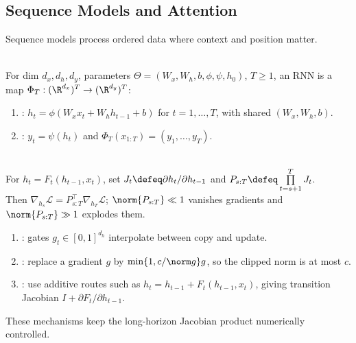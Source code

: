 \subsection{Sequence Models and Attention}

Sequence models process ordered data where context and position matter.

\begin{definition} \label{def:sl-recurrent-network} \\
For dim $d_x,d_h,d_y$, parameters $\Theta=(W_x,W_h,b,\phi,\psi,h_0)$, $T\geq1$, an RNN is a map $\Phi_T:(\R^{d_x})^T\to(\R^{d_y})^T$:
\begin{enumerate}[label=(\roman*)]
\setlength{\itemsep}{0pt}
\item {}: $h_t=\phi(W_xx_t+W_hh_{t-1}+b)$ for $t=1,\ldots,T$, with shared $(W_x,W_h,b)$.
\item {}: $y_t=\psi(h_t)$ and $\Phi_T(x_{1:T})=(y_1,\ldots,y_T)$.
\end{enumerate}
\end{definition}

\begin{remark} \label{rem:sl-long-term-dependencies} \\
For $h_t=F_t(h_{t-1},x_t)$, set $J_t\defeq\partial h_t/\partial h_{t-1}$ and $P_{s:T}\defeq\prod\limits_{t=s+1}^T J_t$.\\
Then $\nabla_{h_s}\mathcal L=P_{s:T}^\top\nabla_{h_T}\mathcal L$; $\norm{P_{s:T}}\ll1$ vanishes gradients and $\norm{P_{s:T}}\gg1$ explodes them.
\begin{enumerate}[label=(\roman*)]
\setlength{\itemsep}{0pt}
\item {}: gates $g_t\in[0,1]^{d_h}$ interpolate between copy and update.
\item {}: replace a gradient $g$ by $\min\{1,c/\norm g\}g$, so the clipped norm is at most $c$.
\item {}: use additive routes such as $h_t=h_{t-1}+F_t(h_{t-1},x_t)$, giving transition Jacobian $I+\partial F_t/\partial h_{t-1}$.
\end{enumerate}
These mechanisms keep the long-horizon Jacobian product numerically controlled.
\end{remark}

